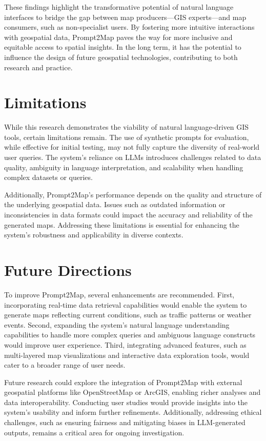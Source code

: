 These findings highlight the transformative potential of natural language interfaces to bridge the gap between map producers—GIS experts—and map consumers, such as non-specialist users. By fostering more intuitive interactions with geospatial data, Prompt2Map paves the way for more inclusive and equitable access to spatial insights. In the long term, it has the potential to influence the design of future geospatial technologies, contributing to both research and practice.

\section{Limitations}

While this research demonstrates the viability of natural language-driven GIS tools, certain limitations remain. The use of synthetic prompts for evaluation, while effective for initial testing, may not fully capture the diversity of real-world user queries. The system's reliance on LLMs introduces challenges related to data quality, ambiguity in language interpretation, and scalability when handling complex datasets or queries.

Additionally, Prompt2Map's performance depends on the quality and structure of the underlying geospatial data. Issues such as outdated information or inconsistencies in data formats could impact the accuracy and reliability of the generated maps. Addressing these limitations is essential for enhancing the system's robustness and applicability in diverse contexts.

\section{Future Directions}

To improve Prompt2Map, several enhancements are recommended. First, incorporating real-time data retrieval capabilities would enable the system to generate maps reflecting current conditions, such as traffic patterns or weather events. Second, expanding the system's natural language understanding capabilities to handle more complex queries and ambiguous language constructs would improve user experience. Third, integrating advanced features, such as multi-layered map visualizations and interactive data exploration tools, would cater to a broader range of user needs.

Future research could explore the integration of Prompt2Map with external geospatial platforms like OpenStreetMap or ArcGIS, enabling richer analyses and data interoperability. Conducting user studies would provide insights into the system's usability and inform further refinements. Additionally, addressing ethical challenges, such as ensuring fairness and mitigating biases in LLM-generated outputs, remains a critical area for ongoing investigation.

